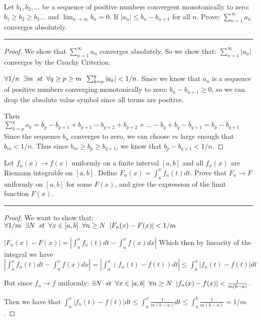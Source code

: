 \documentclass[11pt]{article}
\begin{document}

Let $b_1, b_2, ...$ be a sequence of positive numbers convergent monotonically to zero:
$b_1 \geq b_2 \geq b_3 ...$ and $\lim_{n \to \infty} b_n = 0$.
If $|a_n| \leq b_n - b_{n+1}$ for all $n$. Prove:
$\sum_{n=1}^\infty a_n$ converges absolutely.

\hrule

\begin{proof}
    
    We show that $\sum_{n=1}^\infty a_n$ converges absolutely. So we show that:
    $\sum_{n=1}^\infty |a_n|$ converges by the Cauchy Criterion.

    $\forall 1/n \sp \exists m \sp st \sp \forall q \geq p \geq m \sp \sum_{k = p} ^q |a_k| < 1/n$.
    Since we know that $a_n$ is a sequence of positive numbers converging monotonically to zero:
    $b_n - b_{n+1} \geq 0$, so we can drop the absolute value symbol since all terms are positive.

    Then $\sum_{k = p} ^q a_k = b_p - b_{p+1} + b_{p+1} - b_{p+2} + b_{p+2} + ... - b_q + b_{q} - b_{q+1} = b_p - b_{q+1}$
    Since the sequence $b_n$ converges to zero, we can choose $m$ large enough that $b_m < 1/n$.
    Thus since $b_m \geq b_p \geq b_{q+1}$, we know that $b_p - b_{q+1} < 1/n$.



\end{proof}






Let $f_n(x) \to f(x)$ uniformly on a finite interval $[a,b]$ and all $f_n(x)$
are Riemann integrable on $[a,b]$. Define $F_n (x) = \int_a ^x f_n(t)dt$.
Prove that $F_n \to F$ uniformly on $[a,b]$ for some $F(x)$, 
and give the expression of the limit function $F(x)$.

\hrule


\begin{proof}

    We want to show that: 
    $\forall 1/m \sp \exists N \sp st \sp \forall x \in [a,b] \sp \forall n \geq N \sp |F_n(x) -F(x)| < 1/m$

    $|F_n(x) - F(x)| = \left|\int_a ^x f_n(t)dt - \int_a ^x f(x) dx \right|$
    Which then by linearity of the integral we have 
    $\left|\int_a ^x f_n(t)dt - \int_a ^x f(x) dx \right| = \left|\int_a ^x (f_n(t) - f(t)) dt \right| \leq \int_a ^x |f_n(t) - f(t)| dt $

    But since $f_n \to f$ uniformly: 
    $\exists N \sp st \sp \forall x \in [a,b] \sp \forall n \geq N \sp |f_n(x) -f(x)| < \frac{1}{m (b - a)}$.

    Then we have that $\int_a ^x |f_n(t) - f(t)| dt \leq \int_a ^x \frac{1}{m (b - a)} dt \leq \int_a ^b \frac{1}{m (b - a)} = 1/m$.
\end{proof}
\end{document}
